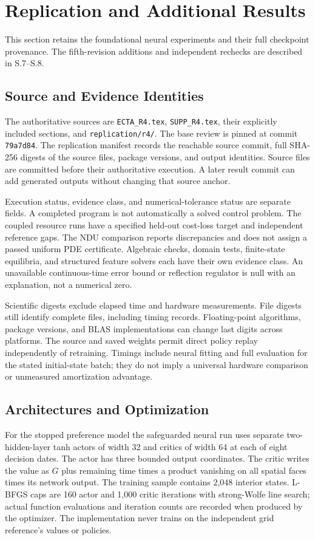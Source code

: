 \section{Replication and Additional Results}
This section retains the foundational neural experiments and their full checkpoint provenance. The fifth-revision additions and independent rechecks are described in S.7--S.8.

\subsection{Source and Evidence Identities}
The authoritative sources are \texttt{ECTA\_R4.tex}, \texttt{SUPP\_R4.tex}, their explicitly included sections, and \texttt{replication/r4/}. The base review is pinned at commit \texttt{79a7d84}. The replication manifest records the reachable source commit, full SHA-256 digests of the source files, package versions, and output identities. Source files are committed before their authoritative execution. A later result commit can add generated outputs without changing that source anchor.

Execution status, evidence class, and numerical-tolerance status are separate fields. A completed program is not automatically a solved control problem. The coupled resource runs have a specified held-out cost-loss target and independent reference gaps. The NDU comparison reports discrepancies and does not assign a passed uniform PDE certificate. Algebraic checks, domain tests, finite-state equilibria, and structured feature solvers each have their own evidence class. An unavailable continuous-time error bound or reflection regulator is null with an explanation, not a numerical zero.

Scientific digests exclude elapsed time and hardware measurements. File digests still identify complete files, including timing records. Floating-point algorithms, package versions, and BLAS implementations can change last digits across platforms. The source and saved weights permit direct policy replay independently of retraining. Timings include neural fitting and full evaluation for the stated initial-state batch; they do not imply a universal hardware comparison or unmeasured amortization advantage.

\subsection{Architectures and Optimization}
For the stopped preference model the safeguarded neural run uses separate two-hidden-layer tanh actors of width 32 and critics of width 64 at each of eight decision dates. The actor has three bounded output coordinates. The critic writes the value as $G$ plus remaining time times a product vanishing on all spatial faces times its network output. The training sample contains 2,048 interior states. L-BFGS caps are 160 actor and 1,000 critic iterations with strong-Wolfe line search; actual function evaluations and iteration counts are recorded when produced by the optimizer. The implementation never trains on the independent grid reference's values or policies.

